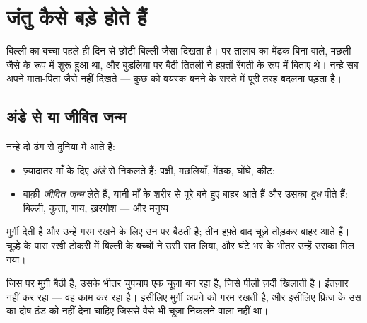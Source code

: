 \chapter{जंतु कैसे बड़े होते हैं}\label{ch:g2:animals-grow-up}

बिल्ली का बच्चा पहले ही दिन से छोटी बिल्ली जैसा दिखता है। पर तालाब का
मेंढक बिना  वाले, मछली जैसे  के रूप में शुरू हुआ था, और
बुडलिया पर बैठी तितली ने हफ़्तों रेंगती  के रूप में बिताए थे।
नन्हे  सब अपने माता-पिता जैसे नहीं दिखते --- कुछ को वयस्क बनने के
रास्ते में पूरी तरह बदलना पड़ता है।

\section{अंडे से या जीवित जन्म}

\begin{definition}[जन्म के दो ढंग]\label{def:g2:animals-grow-up:born}
नन्हे  दो ढंग से दुनिया में आते हैं:
\begin{itemize}
  \item ज़्यादातर माँ के दिए \emph{अंडे} से निकलते हैं:
        पक्षी, मछलियाँ, मेंढक, घोंघे, कीट;
  \item बाक़ी \emph{जीवित जन्म} लेते हैं, यानी माँ
        के शरीर से पूरे बने हुए बाहर आते हैं और उसका
        \emph{दूध} पीते हैं: बिल्ली, कुत्ता, गाय, ख़रगोश
        --- और मनुष्य।
\end{itemize}
\end{definition}

\begin{example}[मुर्ग़ीख़ाने में और टोकरी में]\label{ex:g2:animals-grow-up:henhouse}
मुर्ग़ी  देती है और उन्हें गरम रखने के लिए उन पर बैठती है; तीन
हफ़्ते बाद चूज़े  तोड़कर बाहर आते हैं। चूल्हे के पास रखी टोकरी में
बिल्ली के बच्चों ने उसी रात  लिया, और घंटे भर के भीतर उन्हें
उसका  मिल गया।
\end{example}

\begin{remark}[अंडा पत्थर नहीं है]\label{rem:g2:animals-grow-up:egg}
जिस  पर मुर्ग़ी बैठी है, उसके भीतर चुपचाप एक चूज़ा बन रहा है, जिसे
पीली ज़र्दी खिलाती है।  इंतज़ार नहीं कर रहा --- वह काम कर रहा है।
इसीलिए मुर्ग़ी अपने  को गरम रखती है, और इसीलिए फ़्रिज के उस 
का दोष ठंड को नहीं देना चाहिए जिससे वैसे भी चूज़ा निकलने वाला नहीं था।
\end{remark}

